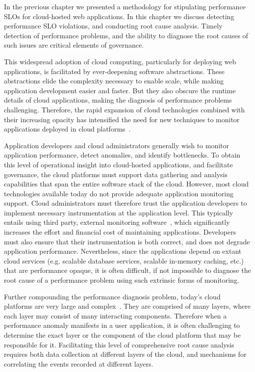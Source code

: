 In the previous chapter we presented a methodology for stipulating performance SLOs
for cloud-hosted web applications. In this chapter we discuss detecting performance SLO
violations, and conducting root cause analysis. Timely detection
of performance problems, and the ability to diagnose the root causes of such issues are 
critical elements of governance.

This widespread adoption of cloud computing, particularly for deploying
web applications, is facilitated by ever-deepening software abstractions.
These abstractions elide the complexity necessary to enable scale, while
making application development easier and faster.
But they also obscure the runtime details of cloud applications, 
making the diagnosis of performance problems challenging. 
Therefore, the rapid expansion of cloud technologies
combined with their increasing opacity has intensified the need 
for new techniques to monitor applications deployed in 
cloud platforms~\cite{DaCunhaRodrigues:2016:MCC:2851613.2851619}. 

Application developers and cloud administrators generally wish to monitor 
application performance, detect anomalies, and identify bottlenecks. To obtain 
this level of operational insight into cloud-hosted applications, 
and facilitate governance, the cloud platforms must support 
data gathering and analysis capabilities that span the entire software stack of the cloud. 
However, most cloud technologies available
today do not provide adequate application monitoring support. 
Cloud administrators must therefore trust the
application developers to implement necessary instrumentation 
at the application level. This typically entails using third party, external monitoring software~\cite{newrelic,dynatrace,datadog},
which significantly increases the effort and financial cost of maintaining applications.
Developers must also ensure
that their instrumentation is both correct, and does not degrade 
application performance.  Nevertheless, since the applications depend on extant
cloud services (e.g. scalable database services, 
scalable in-memory caching, etc.) that are performance opaque, it is
often difficult, if not impossible to diagnose the root cause of a performance problem
using such extrinsic forms of monitoring.

Further compounding the performance
diagnosis problem, today's cloud platforms are very 
large and complex~\cite{DaCunhaRodrigues:2016:MCC:2851613.2851619,Ibidunmoye:2015:PAD:2808687.2791120}. 
They are
comprised of many layers, where each layer may consist of many interacting components.
Therefore when a performance anomaly manifests in a user application, it is
often challenging
to determine the exact layer or the component of the cloud platform that may be responsible for it. 
Facilitating this level of comprehensive root cause analysis requires
both data collection at different layers of the cloud, and mechanisms for correlating 
the events recorded at different layers. 

